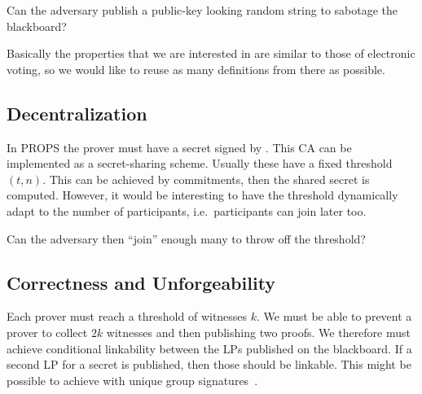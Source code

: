 Can the adversary publish a public-key looking random string to sabotage the 
blackboard?

Basically the properties that we are interested in are similar to those of 
electronic voting, so we would like to reuse as many definitions from there as 
possible.

\subsection{Decentralization}

In \ac{PROPS} the prover must have a secret signed by .
This \ac{CA} can be implemented as a secret-sharing scheme.
Usually these have a fixed threshold \((t, n)\).
This can be achieved by commitments, then the shared secret is computed.
However, it would be interesting to have the threshold dynamically adapt to the 
number of participants, i.e.\ participants can join later too.

Can the adversary then \enquote{join} enough many to throw off the threshold?

\subsection{Correctness and Unforgeability}

Each prover must reach a threshold of witnesses \(k\).
We must be able to prevent a prover to collect \(2k\) witnesses and then 
publishing two proofs.
We therefore must achieve conditional linkability between the \acp{LP} 
published on the blackboard.
If a second \ac{LP} for a secret is published, then those should be linkable.
This might be possible to achieve with unique group 
signatures~\cite{UniqueGroupSignatures,UniqueRingSignatures,ListSignatures}.



